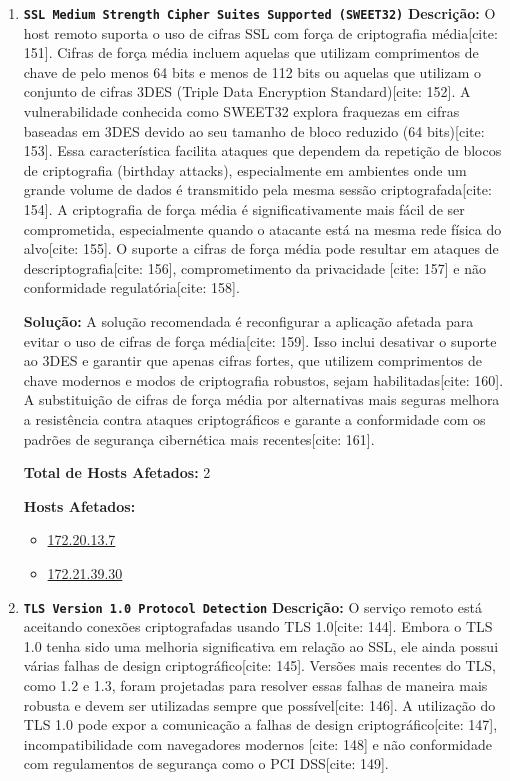 \documentclass[a4paper,12pt]{article}
\begin{document}
\begin{enumerate}
\item \textbf{\texttt{SSL Medium Strength Cipher Suites Supported (SWEET32)}}
\textbf{Descrição:} O host remoto suporta o uso de cifras SSL com força de criptografia média[cite: 151]. Cifras de força média incluem aquelas que utilizam comprimentos de chave de pelo menos 64 bits e menos de 112 bits ou aquelas que utilizam o conjunto de cifras 3DES (Triple Data Encryption Standard)[cite: 152]. A vulnerabilidade conhecida como SWEET32 explora fraquezas em cifras baseadas em 3DES devido ao seu tamanho de bloco reduzido (64 bits)[cite: 153]. Essa característica facilita ataques que dependem da repetição de blocos de criptografia (birthday attacks), especialmente em ambientes onde um grande volume de dados é transmitido pela mesma sessão criptografada[cite: 154]. A criptografia de força média é significativamente mais fácil de ser comprometida, especialmente quando o atacante está na mesma rede física do alvo[cite: 155]. O suporte a cifras de força média pode resultar em ataques de descriptografia[cite: 156], comprometimento da privacidade [cite: 157] e não conformidade regulatória[cite: 158].

\textbf{Solução:} A solução recomendada é reconfigurar a aplicação afetada para evitar o uso de cifras de força média[cite: 159]. Isso inclui desativar o suporte ao 3DES e garantir que apenas cifras fortes, que utilizem comprimentos de chave modernos e modos de criptografia robustos, sejam habilitadas[cite: 160]. A substituição de cifras de força média por alternativas mais seguras melhora a resistência contra ataques criptográficos e garante a conformidade com os padrões de segurança cibernética mais recentes[cite: 161].

\textbf{Total de Hosts Afetados:} 2

\textbf{Hosts Afetados:}
\begin{itemize}
    \item \url{172.20.13.7}
    \item \url{172.21.39.30}
\end{itemize}

\item \textbf{\texttt{TLS Version 1.0 Protocol Detection}}
\textbf{Descrição:} O serviço remoto está aceitando conexões criptografadas usando TLS 1.0[cite: 144]. Embora o TLS 1.0 tenha sido uma melhoria significativa em relação ao SSL, ele ainda possui várias falhas de design criptográfico[cite: 145]. Versões mais recentes do TLS, como 1.2 e 1.3, foram projetadas para resolver essas falhas de maneira mais robusta e devem ser utilizadas sempre que possível[cite: 146]. A utilização do TLS 1.0 pode expor a comunicação a falhas de design criptográfico[cite: 147], incompatibilidade com navegadores modernos [cite: 148] e não conformidade com regulamentos de segurança como o PCI DSS[cite: 149].


\end{enumerate}
\end{document}

